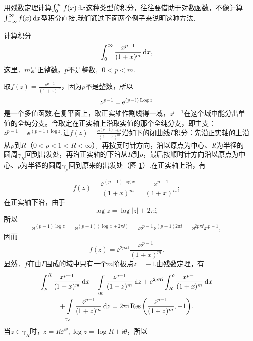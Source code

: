 用残数定理计算$\int_0^\infty f(x)\mathop{}\!\mathrm dx$这种类型的积分，往往要借助于对数函数，不像计算$\int_{-\infty}^\infty f(x)\mathop{}\!\mathrm dx$型积分直接.我们通过下面两个例子来说明这种方法.
\begin{example}\label{exam5.5.11}
计算积分
\[\int_0^\infty\frac{x^{p-1}}{(1+x)^m}\mathop{}\!\mathrm dx,\]
这里，$m$是正整数，$p$不是整数，$0<p<m$.
\end{example}
\begin{solution}
取$f(z)=\frac{z^{p-1}}{(1+z)^m}$，因为$p$不是整数，所以
\[z^{p-1}=\operatorname{\!\!\;\mathrm e}^{(p-1)\operatorname{Log} z}\]
是一个多值函数.在复平面上，取正实轴作割线得一域，$z^{p-1}$在这个域中能分出单值的全纯分支。今取定在正实轴上沿取实值的那个全纯分支，即主支：$z^{p-1}=\ee^{(p-1)\log z}$.让$f(z)=
\frac{\ee^{(p-1)\log z}}{(1+z)^m}$沿如下的闭曲线$\Gamma$积分：先沿正实轴的上沿从$\rho$到$R$（$0<\rho<1<R<\infty$），再按反时针方向，沿以原点为中心、$R$为半径的圆周$\gamma_R$回到出发处，再沿正实轴的下沿从$R$到$\rho$，最后按顺时针方向沿以原点为中心、$\rho$为半径的圆周$\gamma_\rho$回到原来的出发处（图 \ref{fig5.4}）.在正实轴上沿，有
\begin{figure}[!ht]
\centering
{}
\caption{\label{fig5.4}}
\end{figure}
\[f(z)=\frac{\ee^{(p-1)\log x}}{(1+x)^m}=\frac{x^{p-1}}{(1+x)^m};\]
在正实轴下沿，由于
\[\log z=\log|z|+2\pi\ii,\]
所以
\[\ee^{(p-1)\log z}=\ee^{(p-1)(\log x+2\pi\ii)}=x^{p-1}\ee^{(p-1)2\pi\ii}=\ee^{2p\pi\ii}x^{p-1},\]
因而
\[f(z)=\ee^{2p\pi\ii}\frac{x^{p-1}}{(1+x)^m}.\]
显然，$f$在由$\Gamma$围成的域中只有一个$m$阶极点$z=-1$.由残数定理，有
\begin{equation}\label{eq5.5.7}
\begin{gathered}
\int_\rho^R\frac{x^{p-1}}{(1+x)^m}\mathop{}\!\mathrm dx+\int\limits_{\gamma_R}\frac{z^{p-1}}{(1+z)^m}\mathop{}\!\mathrm dz
+\operatorname{\!\!\;\mathrm e}^{2p\uppi\mathrm i}\int_R^\rho\frac{x^{p-1}}{(1+x)^m}\mathop{}\!\mathrm dx\\
+\int\limits_{\gamma_\rho^-}\frac{z^{p-1}}{(1+z)^m}\mathop{}\!\mathrm dz=
2\uppi\mathrm i\operatorname*{Res}\bigg(\frac{z^{p-1}}{(1+z)^m},-1\bigg).
\end{gathered}
\end{equation}
当$z\in\gamma_R$时，$z=R\ee^{\ii\theta},\log z=\log R+\ii\theta$，所以

\end{solution}
